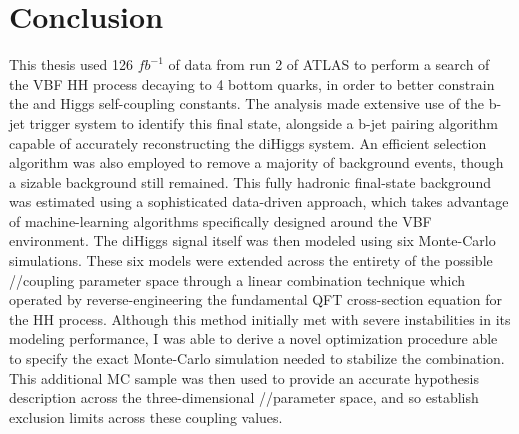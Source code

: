 \chapter{Conclusion}\label{chapter:conclusion}

This thesis used 126 $\textit{fb}^{-1}$ of data from run 2 of ATLAS
    to perform a search of the VBF \to HH process decaying to 4 bottom quarks,
    in order to better constrain the \kl and \kvv Higgs self-coupling constants.
The analysis made extensive use of the b-jet trigger system to identify this final state,
    alongside a b-jet pairing algorithm capable of accurately reconstructing the diHiggs system.
An efficient selection algorithm was also employed to remove a majority of background events,
    though a sizable background still remained.
This fully hadronic final-state background was estimated using a sophisticated data-driven approach,
    which takes advantage of machine-learning algorithms specifically designed around the VBF environment.
The diHiggs signal itself was then modeled using six Monte-Carlo simulations.
These six models were extended across the entirety of the possible \kvv/\kl/\kvv coupling parameter space
    through a linear combination technique
    which operated by reverse-engineering the fundamental QFT cross-section equation for the HH process.
Although this method initially met with severe instabilities in its modeling performance,
    I was able to derive a novel optimization procedure able to specify
    the exact Monte-Carlo simulation needed to stabilize the combination.
This additional MC sample was then used to provide an accurate hypothesis description across
    the three-dimensional \kvv/\kl/\kv parameter space,
    and so establish exclusion limits across these coupling values. 

